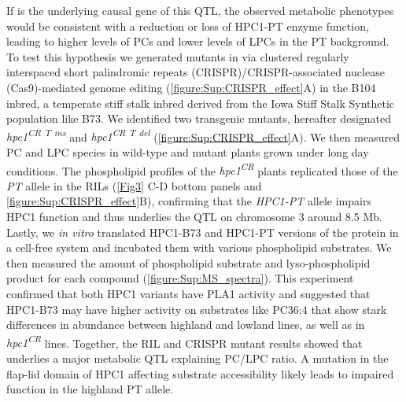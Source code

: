 If \hpc is the underlying causal gene of this QTL, the observed metabolic phenotypes would be consistent with a reduction or loss of HPC1-PT enzyme function, leading to higher levels of PCs and lower levels of LPCs in the PT background. 
To test this hypothesis we generated mutants in \hpc via clustered regularly interspaced short palindromic repeats (CRISPR)/CRISPR-associated nuclease (Cas9)-mediated genome editing (\cref{figure:Sup:CRISPR_effect}A) in the B104 inbred, a temperate stiff stalk inbred derived from the Iowa Stiff Stalk Synthetic population like B73. 
We identified two transgenic mutants, hereafter designated \textit{hpc1\textsuperscript{CR T ins}} and \textit{hpc1\textsuperscript{CR T del}} (\cref{figure:Sup:CRISPR_effect}A).
We then measured PC and LPC species in wild-type and mutant plants grown under long day conditions.  
The phospholipid profiles of the \textit{hpc1\textsuperscript{CR}} plants 
replicated those of the \textit{PT} allele in the RILs (\cref{Fig3} C-D bottom panels and \cref{figure:Sup:CRISPR_effect}B), confirming that the \textit{HPC1-PT} allele impairs HPC1 function and thus underlies the QTL on chromosome 3 around 8.5 Mb. 
Lastly, we \textit{in vitro} translated HPC1-B73 and HPC1-PT  versions of the protein in a cell-free system and incubated them with various phospholipid substrates. 
We then measured the amount of phospholipid substrate and lyso-phospholipid product for each compound (\cref{figure:Sup:MS_spectra}). 
This experiment confirmed that both HPC1 variants have PLA1 activity and suggested that HPC1-B73 may have higher activity on substrates like PC36:4 that show stark differences in abundance between highland and lowland lines, as well as in \textit{hpc1\textsuperscript{CR}} lines.
Together, the RIL and CRISPR mutant results showed that \hpc underlies a major metabolic QTL explaining PC/LPC ratio. 
A mutation in the flap-lid domain of HPC1 affecting substrate accessibility likely leads to impaired function in the highland PT allele.

